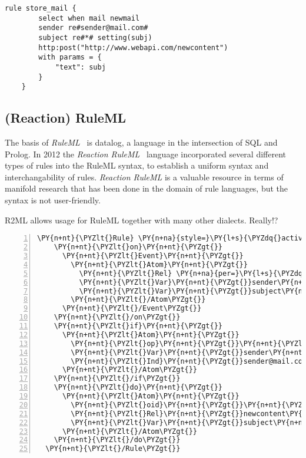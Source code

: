 \begin{lstlisting}[frame=single,float=h,label=lstkre,language=KRE,caption=E-Mail Example rule in KRL]
	rule store_mail {
		select when mail newmail
		sender re#sender@mail.com#
		subject re#*# setting(subj)
		http:post("http://www.webapi.com/newcontent")
		with params = {
			"text": subj
		}
	}
\end{lstlisting}


\subsection{(Reaction) RuleML}
The basis of \emph{RuleML}~\cite{2006-Boley-RuleML.pdf} is datalog, a language in the intersection of SQL and Prolog.
In 2012 the \emph{Reaction RuleML}~\cite{2012-Paschke_etal-ReactionRuleML.pdf} language incorporated several different types of rules into the RuleML syntax, to establish a uniform syntax and interchangability of rules.
\emph{Reaction RuleML} is a valuable resource in terms of manifold research that has been done in the domain of rule languages, but the syntax is not user-friendly.


R2ML allows usage for RuleML together with many other dialects. Really!?

\begin{Verbatim}[frame=single,fontsize=\footnotesize,commandchars=\\\{\},numbers=left,firstnumber=1,stepnumber=1,xleftmargin
=.3in]
  \PY{n+nt}{\PYZlt{}Rule} \PY{n+na}{style=}\PY{l+s}{\PYZdq{}active\PYZdq{}}\PY{n+nt}{\PYZgt{}}
    \PY{n+nt}{\PYZlt{}on}\PY{n+nt}{\PYZgt{}}
      \PY{n+nt}{\PYZlt{}Event}\PY{n+nt}{\PYZgt{}}
        \PY{n+nt}{\PYZlt{}Atom}\PY{n+nt}{\PYZgt{}}
          \PY{n+nt}{\PYZlt{}Rel} \PY{n+na}{per=}\PY{l+s}{\PYZdq{}value\PYZdq{}}\PY{n+nt}{\PYZgt{}}mail\PY{n+nt}{\PYZlt{}/Rel\PYZgt{}}
          \PY{n+nt}{\PYZlt{}Var}\PY{n+nt}{\PYZgt{}}sender\PY{n+nt}{\PYZlt{}/Var\PYZgt{}}
          \PY{n+nt}{\PYZlt{}Var}\PY{n+nt}{\PYZgt{}}subject\PY{n+nt}{\PYZlt{}/Var\PYZgt{}}
        \PY{n+nt}{\PYZlt{}/Atom\PYZgt{}}
      \PY{n+nt}{\PYZlt{}/Event\PYZgt{}}
    \PY{n+nt}{\PYZlt{}/on\PYZgt{}}
    \PY{n+nt}{\PYZlt{}if}\PY{n+nt}{\PYZgt{}}
      \PY{n+nt}{\PYZlt{}Atom}\PY{n+nt}{\PYZgt{}}
        \PY{n+nt}{\PYZlt{}op}\PY{n+nt}{\PYZgt{}}\PY{n+nt}{\PYZlt{}Rel}\PY{n+nt}{\PYZgt{}}equals\PY{n+nt}{\PYZlt{}/Rel\PYZgt{}}\PY{n+nt}{\PYZlt{}/op\PYZgt{}}
        \PY{n+nt}{\PYZlt{}Var}\PY{n+nt}{\PYZgt{}}sender\PY{n+nt}{\PYZlt{}/Var\PYZgt{}}
        \PY{n+nt}{\PYZlt{}Ind}\PY{n+nt}{\PYZgt{}}sender@mail.com\PY{n+nt}{\PYZlt{}/Ind\PYZgt{}}
      \PY{n+nt}{\PYZlt{}/Atom\PYZgt{}}
    \PY{n+nt}{\PYZlt{}/if\PYZgt{}}
    \PY{n+nt}{\PYZlt{}do}\PY{n+nt}{\PYZgt{}}
      \PY{n+nt}{\PYZlt{}Atom}\PY{n+nt}{\PYZgt{}}
        \PY{n+nt}{\PYZlt{}oid}\PY{n+nt}{\PYZgt{}}\PY{n+nt}{\PYZlt{}Ind} \PY{n+na}{uri=}\PY{l+s}{\PYZdq{}http://webapi.com\PYZdq{}}\PY{n+nt}{/\PYZgt{}}\PY{n+nt}{\PYZlt{}/oid\PYZgt{}}
        \PY{n+nt}{\PYZlt{}Rel}\PY{n+nt}{\PYZgt{}}newcontent\PY{n+nt}{\PYZlt{}/Rel\PYZgt{}}
        \PY{n+nt}{\PYZlt{}Var}\PY{n+nt}{\PYZgt{}}subject\PY{n+nt}{\PYZlt{}/Var\PYZgt{}} 
      \PY{n+nt}{\PYZlt{}/Atom\PYZgt{}}
    \PY{n+nt}{\PYZlt{}/do\PYZgt{}}
  \PY{n+nt}{\PYZlt{}/Rule\PYZgt{}}
\end{Verbatim}

